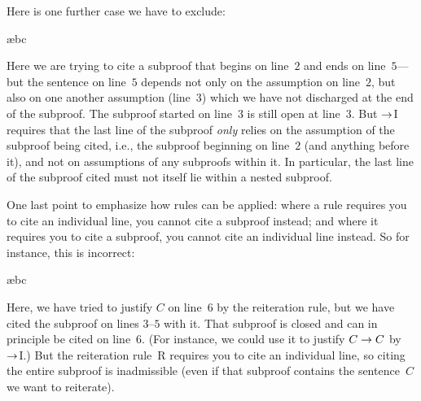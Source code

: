 Here is one further case we have to exclude:
\begin{fitchproof}
\open
	\open
	\ae{bc}
	\close
\close
{}
 
\end{fitchproof}
Here we are trying to cite a subproof that begins on line~$2$ and ends on line~$5$---but the sentence on line~$5$ depends not only on the assumption on line~$2$, but also on one another assumption (line~$3$) which we have not discharged at the end of the subproof. The subproof started on line~$3$ is still open at line~$3$. But $\rightarrow$I requires that the last line of the subproof \emph{only} relies on the assumption of the subproof being cited, i.e., the subproof beginning on line~$2$ (and anything before it), and not on assumptions of any subproofs within it. In particular, the last line of the subproof cited must not itself lie within a nested subproof.


One last point to emphasize how rules can be applied: where a rule requires you to cite an individual line, you cannot cite a subproof instead; and where it requires you to cite a subproof, you cannot cite an individual line instead. So for instance, this is incorrect:
\begin{fitchproof}
\open
	\open
	\ae{bc}
	\close
 
\close
{}
\end{fitchproof}
Here, we have tried to justify $C$ on line~$6$ by the reiteration rule, but we have cited the subproof on lines $3$--$5$ with it. That subproof is closed and can in principle be cited on line~$6$. (For instance, we could use it to justify $C \rightarrow C$ by $\rightarrow$I.) But the reiteration rule~R requires you to cite an individual line, so citing the entire subproof is inadmissible (even if that subproof contains the sentence~$C$ we want to reiterate).



